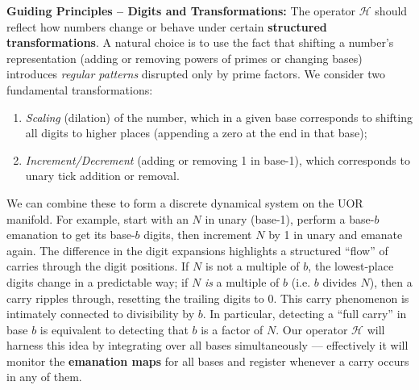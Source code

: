 \documentclass{article}
\begin{document}
\medskip

\textbf{Guiding Principles -- Digits and Transformations:} The operator $\mathcal{H}$ should reflect how numbers change or behave under certain \textbf{structured transformations}. A natural choice is to use the fact that shifting a number’s representation (adding or removing powers of primes or changing bases) introduces \emph{regular patterns} disrupted only by prime factors. We consider two fundamental transformations:
\begin{enumerate}[leftmargin=*, label=(\arabic*)]
\item \emph{Scaling} (dilation) of the number, which in a given base corresponds to shifting all digits to higher places (appending a zero at the end in that base);
\item \emph{Increment/Decrement} (adding or removing 1 in base-1), which corresponds to unary tick addition or removal.
\end{enumerate}
We can combine these to form a discrete dynamical system on the UOR manifold. For example, start with an $N$ in unary (base-1), perform a base-$b$ emanation to get its base-$b$ digits, then increment $N$ by 1 in unary and emanate again. The difference in the digit expansions highlights a structured “flow” of carries through the digit positions. If $N$ is not a multiple of $b$, the lowest-place digits change in a predictable way; if $N$ \emph{is} a multiple of $b$ (i.e. $b$ divides $N$), then a carry ripples through, resetting the trailing digits to $0$. This carry phenomenon is intimately connected to divisibility by $b$. In particular, detecting a ``full carry'' in base $b$ is equivalent to detecting that $b$ is a factor of $N$. Our operator $\mathcal{H}$ will harness this idea by integrating over all bases simultaneously --- effectively it will monitor the \textbf{emanation maps} for all bases and register whenever a carry occurs in any of them.

\medskip
\end{document}
